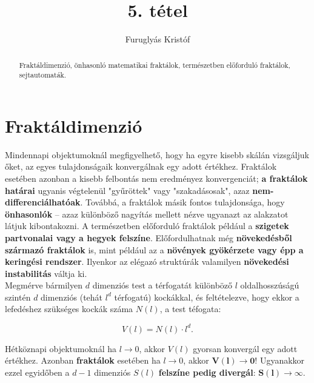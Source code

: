 \documentclass[12pt]{article}
\theoremstyle{plain}
\begin{document}
\title{5. tétel}
\author{Furuglyás Kristóf}

\maketitle


\begin{abstract}
    Fraktáldimenzió, önhasonló matematikai fraktálok, természetben előforduló fraktálok, sejtautomaták.
\end{abstract}

\vfill

\tableofcontents

\newpage

\section{Fraktáldimenzió}
Mindennapi objektumoknál megfigyelhető, hogy ha egyre kisebb skálán vizsgáljuk őket, az egyes tulajdonságaik konvergálnak egy adott értékhez. Fraktálok esetében azonban a kisebb felbontás nem eredményez konvergenciát; \textbf{a fraktálok határai} ugyanis végtelenül "gyűröttek" vagy "szakadásosak", azaz \textbf{nem-differenciálhatóak}. Továbbá, a fraktálok másik fontos tulajdonsága, hogy \textbf{önhasonlók} -- azaz különböző nagyítás mellett nézve ugyanazt az alakzatot látjuk kibontakozni. A természetben előforduló fraktálok például a \textbf{szigetek partvonalai vagy a hegyek felszíne}. Előfordulhatnak még \textbf{növekedésből származó fraktálok} is, mint például az a \textbf{növények gyökérzete vagy épp a keringési rendszer}. Ilyenkor az elégazó struktúrák valamilyen \textbf{növekedési instabilitás} váltja ki. \\

Megmérve bármilyen $d$ dimenziós test a térfogatát különböző $l$ oldalhosszúságú szintén $d$ dimenziós (tehát $l^d$ térfogatú) kockákkal, és feltételezve, hogy ekkor a lefedéshez szükséges kockák száma $N \left( l \right)$, a test téfogata: 

\begin{equation}
V \left( l \right) =  N \left( l \right) \cdot l^d.
\end{equation}

Hétköznapi objektumoknál ha $l \rightarrow 0$, akkor $V \left(l \right)$ gyorsan konvergál egy adott értékhez. Azonban \textbf{fraktálok} esetében ha $l \rightarrow 0$, akkor $\mathbf{V \left(l \right) \rightarrow 0}$! Ugyanakkor ezzel egyidőben a $d-1$ dimenziós $S \left( l\right)$ \textbf{felszíne pedig divergál}: $\mathbf{ S \left( l \right) \rightarrow \infty}$. \\
\end{document}
